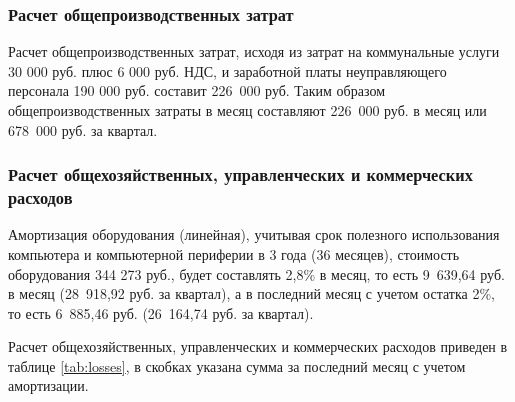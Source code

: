 \documentclass[../main]{subfiles}
\begin{document}
\subsubsection{Расчет общепроизводственных затрат}

Расчет общепроизводственных затрат, исходя из затрат на коммунальные услуги 30 000 руб. плюс 6 000 руб. НДС, и заработной платы неуправляющего персонала 190 000 руб. составит 226 000 руб. Таким образом общепроизводственных затраты в месяц составляют 226 000 руб. в месяц или 678 000 руб. за квартал.

\subsubsection{Расчет общехозяйственных, управленческих и коммерческих расходов}

Амортизация оборудования (линейная), учитывая срок полезного использования компьютера и компьютерной периферии в 3 года (36 месяцев), стоимость оборудования 344 273 руб., будет составлять 2,8\% в месяц, то есть 9 639,64 руб. в месяц (28 918,92 руб. за квартал), а в последний месяц с учетом остатка 2\%, то есть 6 885,46 руб. (26 164,74 руб. за квартал).

Расчет общехозяйственных, управленческих и коммерческих расходов приведен в таблице \ref{tab:losses}, в скобках указана сумма за последний месяц с учетом амортизации.
\end{document}

